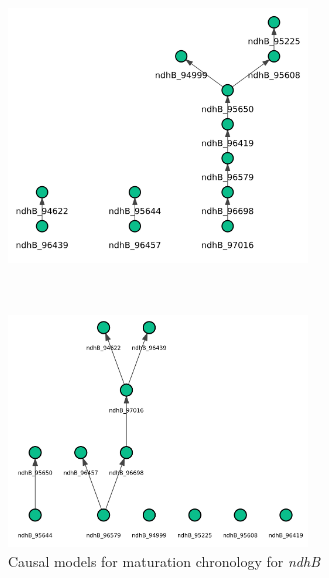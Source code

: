 \documentclass[
]{article}
\theoremstyle{definition}
\theoremstyle{remark}
\begin{document}
\begin{figure}[H]
\begin{minipage}{0.43\linewidth}
\end{minipage}%
\newline
\begin{minipage}{0.43\linewidth}

\includegraphics[width=3.125in,height=\textheight,keepaspectratio]{Figures Causal Chronology/chron_DAG_LiNGAM_ndhB.png}

\end{minipage}%
%
\begin{minipage}{0.13\linewidth}
~\end{minipage}%
%
\begin{minipage}{0.43\linewidth}

\includegraphics[width=3.125in,height=\textheight,keepaspectratio]{Figures Causal Chronology/chron_DAG_NOTEARS_ndhB.png}

\end{minipage}%

\caption{\label{fig-Chron_ndhB}Causal models for maturation chronology
for \emph{ndhB}}

\end{figure}%
\end{document}
